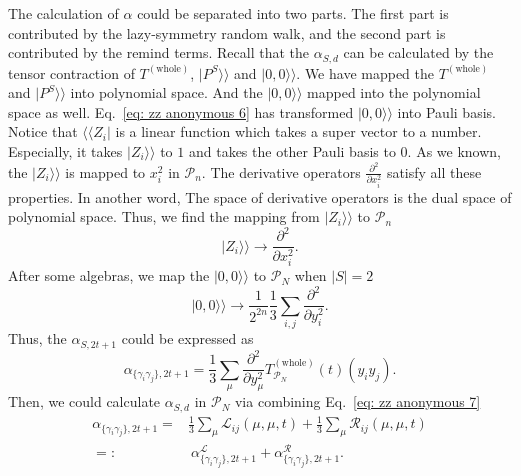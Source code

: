 \documentclass{article}
\newcommand{\Twhole}{T^{(\text{whole})}}
\newcommand{\alpl}{\alpha_{\{\gamma_i\gamma_j\}, 2t+1}^{\mathscr{L}}}
\newcommand{\supket}[1]{|#1 \rangle\rangle}
\newcommand{\supbra}[1]{\langle\langle #1 |}
\begin{document}
The calculation of $\alpha$ could be separated into two parts. The first part is contributed by the lazy-symmetry random walk, and the second part is contributed by the remind terms. Recall that the $\alpha_{S, d}$ can be calculated by the tensor contraction of $\Twhole$, $\supket{P^S}$ and $\supket{0,0}$. We have mapped the $\Twhole$ and $\supket{P^S}$ into polynomial space. And the $\supket{0,0}$ mapped into the polynomial space as well. Eq.~\eqref{eq: zz anonymous 6} has transformed $\supket{0,0}$ into Pauli basis. Notice that  $\supbra{Z_i}$ is a linear function which takes a super vector to a number. Especially, it takes $\supket{Z_i}$ to $1$ and takes the other Pauli basis to $0$. As we known, the $\supket{Z_i}$ is mapped to $x_i^2$ in $\mathcal{P}_n$. The derivative operators $\frac{\partial^2}{\partial x_i^2 }$ satisfy all these properties. 
In another word, The space of derivative operators is the dual space of polynomial space. 
Thus, we find the mapping from $\supket{Z_i}$ to $\mathcal{P}_n$
\begin{equation}
    \supket{Z_i} \to \frac{\partial^2}{\partial x_i^2 }.
\end{equation}
After some algebras, we map the $\supket{0,0}$ to $\mathcal{P}_N$ when $|S| = 2$
\begin{equation}
    \supket{0,0} \to \frac{1}{2^{2n}} \frac{1}{3} \sum_{i,j} \frac{\partial^2}{\partial y_i^2 }.
\end{equation}
Thus, the $\alpha_{S,2t+1}$ could be expressed as
\begin{equation}
    \alpha_{\{\gamma_i\gamma_j\},2t+1} = \frac{1}{3} \sum_{\mu} \frac{\partial^2}{\partial y_\mu^2 } \Twhole_{\mathcal{P}_N}(t) (y_i y_j).
\end{equation}
Then, we could calculate $\alpha_{S,d}$ in $\mathcal{P}_N$ via combining Eq.~\eqref{eq: zz anonymous 7}
\begin{align}
    \alpha_{\{\gamma_i\gamma_j\},2t+1} =& \frac{1}{3} \sum_\mu \mathscr{L}_{ij} (\mu, \mu, t) + \frac{1}{3} \sum_\mu \mathscr{R}_{ij} (\mu, \mu, t) \\
    =:& ~\alpl + \alpha_{\{\gamma_i\gamma_j\}, 2t+1}^{\mathscr{R}}.
    \label{eq: zz anonymous 24}
\end{align}

\end{document}
